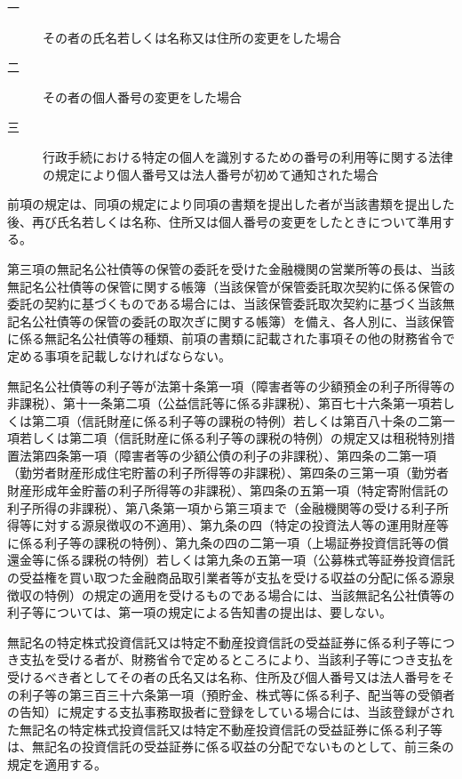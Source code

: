 \documentclass[twocolumn,a4j,10pt]{ltjtarticle}
\begin{document}
\begin{description}
\begin{description}
\item[一]その者の氏名若しくは名称又は住所の変更をした場合
\item[二]その者の個人番号の変更をした場合
\item[三]行政手続における特定の個人を識別するための番号の利用等に関する法律の規定により個人番号又は法人番号が初めて通知された場合
\end{description}
\item[\rensuji{5}]前項の規定は、同項の規定により同項の書類を提出した者が当該書類を提出した後、再び氏名若しくは名称、住所又は個人番号の変更をしたときについて準用する。
\item[\rensuji{6}]第三項の無記名公社債等の保管の委託を受けた金融機関の営業所等の長は、当該無記名公社債等の保管に関する帳簿（当該保管が保管委託取次契約に係る保管の委託の契約に基づくものである場合には、当該保管委託取次契約に基づく当該無記名公社債等の保管の委託の取次ぎに関する帳簿）を備え、各人別に、当該保管に係る無記名公社債等の種類、前項の書類に記載された事項その他の財務省令で定める事項を記載しなければならない。
\item[\rensuji{7}]無記名公社債等の利子等が法第十条第一項（障害者等の少額預金の利子所得等の非課税）、第十一条第二項（公益信託等に係る非課税）、第百七十六条第一項若しくは第二項（信託財産に係る利子等の課税の特例）若しくは第百八十条の二第一項若しくは第二項（信託財産に係る利子等の課税の特例）の規定又は租税特別措置法第四条第一項（障害者等の少額公債の利子の非課税）、第四条の二第一項（勤労者財産形成住宅貯蓄の利子所得等の非課税）、第四条の三第一項（勤労者財産形成年金貯蓄の利子所得等の非課税）、第四条の五第一項（特定寄附信託の利子所得の非課税）、第八条第一項から第三項まで（金融機関等の受ける利子所得等に対する源泉徴収の不適用）、第九条の四（特定の投資法人等の運用財産等に係る利子等の課税の特例）、第九条の四の二第一項（上場証券投資信託等の償還金等に係る課税の特例）若しくは第九条の五第一項（公募株式等証券投資信託の受益権を買い取つた金融商品取引業者等が支払を受ける収益の分配に係る源泉徴収の特例）の規定の適用を受けるものである場合には、当該無記名公社債等の利子等については、第一項の規定による告知書の提出は、要しない。
\item[\rensuji{8}]無記名の特定株式投資信託又は特定不動産投資信託の受益証券に係る利子等につき支払を受ける者が、財務省令で定めるところにより、当該利子等につき支払を受けるべき者としてその者の氏名又は名称、住所及び個人番号又は法人番号をその利子等の第三百三十六条第一項（預貯金、株式等に係る利子、配当等の受領者の告知）に規定する支払事務取扱者に登録をしている場合には、当該登録がされた無記名の特定株式投資信託又は特定不動産投資信託の受益証券に係る利子等は、無記名の投資信託の受益証券に係る収益の分配でないものとして、前三条の規定を適用する。

\end{description}
\end{document}
